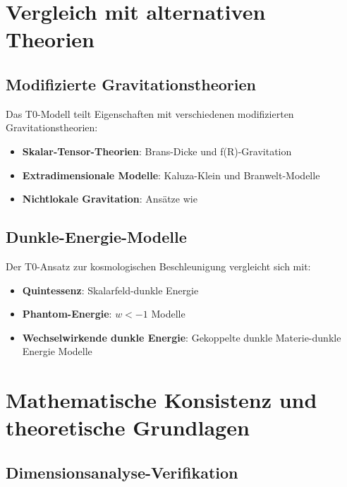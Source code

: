 \documentclass[12pt,a4paper]{article}
\begin{document}
	\section{Vergleich mit alternativen Theorien}
	\label{sec:alternative_theories}
	
	\subsection{Modifizierte Gravitationstheorien}
	\label{subsec:modified_gravity}
	
	Das T0-Modell teilt Eigenschaften mit verschiedenen modifizierten Gravitationstheorien:
	
	\begin{itemize}
		\item \textbf{Skalar-Tensor-Theorien}: Brans-Dicke \citep{brans1961} und f(R)-Gravitation \citep{sotiriou2010}
		\item \textbf{Extradimensionale Modelle}: Kaluza-Klein \citep{kaluza1921,klein1926} und Branwelt-Modelle \citep{randall1999}
		\item \textbf{Nichtlokale Gravitation}: Ansätze wie \citep{woodard2007,koivisto2008}
	\end{itemize}
	
	\subsection{Dunkle-Energie-Modelle}
	\label{subsec:dark_energy_models}
	
	Der T0-Ansatz zur kosmologischen Beschleunigung vergleicht sich mit:
	\begin{itemize}
		\item \textbf{Quintessenz}: Skalarfeld-dunkle Energie \citep{caldwell1998,steinhardt1999}
		\item \textbf{Phantom-Energie}: $w < -1$ Modelle \citep{caldwell2003}
		\item \textbf{Wechselwirkende dunkle Energie}: Gekoppelte dunkle Materie-dunkle Energie Modelle \citep{amendola2000}
	\end{itemize}
	
	\section{Mathematische Konsistenz und theoretische Grundlagen}
	\label{sec:mathematical_consistency}
	
	\subsection{Dimensionsanalyse-Verifikation}
	\label{subsec:dimensional_verification}
	
\end{document}

